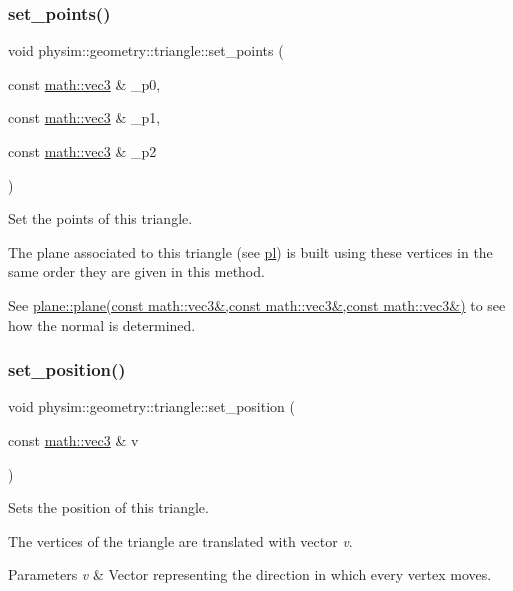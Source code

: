 \subsubsection{\texorpdfstring{set\+\_\+points()}{set\_points()}}
{\footnotesize\ttfamily void physim\+::geometry\+::triangle\+::set\+\_\+points (\begin{DoxyParamCaption}\item[{const \hyperlink{structphysim_1_1math_1_1vec3}{math\+::vec3} \&}]{\+\_\+p0,  }\item[{const \hyperlink{structphysim_1_1math_1_1vec3}{math\+::vec3} \&}]{\+\_\+p1,  }\item[{const \hyperlink{structphysim_1_1math_1_1vec3}{math\+::vec3} \&}]{\+\_\+p2 }\end{DoxyParamCaption})}



Set the points of this triangle. 

The plane associated to this triangle (see \hyperlink{classphysim_1_1geometry_1_1triangle_a4fcfc136bcc0d2cdf31c37a7a71fc9f8}{pl}) is built using these vertices in the same order they are given in this method.

See \hyperlink{classphysim_1_1geometry_1_1plane_a7ff5e0444f792d759198fb7339c9dc1a}{plane\+::plane(const math\+::vec3\&,const math\+::vec3\&,const math\+::vec3\&)} to see how the normal is determined. \mbox{\label{classphysim_1_1geometry_1_1triangle_a9446670dcea26f020c4ad10c7234cce6}} 
\subsubsection{\texorpdfstring{set\+\_\+position()}{set\_position()}}
{\footnotesize\ttfamily void physim\+::geometry\+::triangle\+::set\+\_\+position (\begin{DoxyParamCaption}\item[{const \hyperlink{structphysim_1_1math_1_1vec3}{math\+::vec3} \&}]{v }\end{DoxyParamCaption})\hspace{0.3cm}{\ttfamily [virtual]}}



Sets the position of this triangle. 

The vertices of the triangle are translated with vector {\itshape v}. 
\begin{DoxyParams}{Parameters}
{\em v} & Vector representing the direction in which every vertex moves. \\
\hline
\end{DoxyParams}


